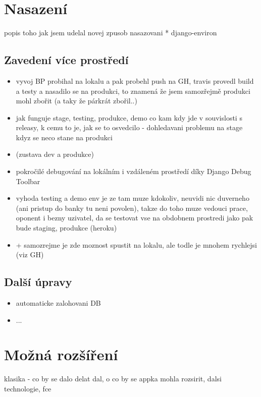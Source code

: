 \chapter{Nasazení}
popis toho jak jsem udelal novej zpusob nasazovani
* django-environ

\section{Zavedení více prostředí}
\begin{itemize}
\item vyvoj BP probihal na lokalu a pak probehl push na GH, travis provedl build a testy a nasadilo se na produkci, to znamená že jsem samozřejmě produkci mohl zbořit (a taky že párkrát zbořil..)
\item jak funguje stage, testing, produkce, demo co kam kdy jde v souvislosti s releasy, k cemu to je, jak se to osvedcilo - dohledavani problemu na stage kdyz se neco stane na produkci
\item (zustava dev a produkce)
\item pokročilé debugování na lokálním i vzdáleném prostředí díky Django Debug Toolbar 
\item vyhoda testing a demo env je ze tam muze kdokoliv, neuvidi nic duverneho (ani pristup do banky tu neni povolen), takze do toho muze vedouci prace, oponent i bezny uzivatel, da se testovat vse na obdobnem prostredi jako pak bude staging, produkce (heroku)
\item + samozrejme je zde moznost spustit na lokalu, ale todle je mnohem rychlejsi (viz GH)
\end{itemize}

\section{Další úpravy}
\begin{itemize}
\item automaticke zalohovani DB
\item ...
\end{itemize}



\chapter{Možná rozšíření}
klasika - co by se dalo delat dal, o co by se appka mohla rozsirit, dalsi technologie, fce

